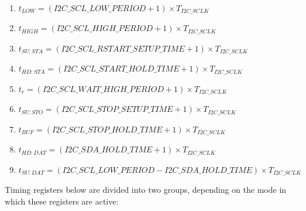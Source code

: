 \documentclass[main\_\_EN.tex]{subfiles}
\begin{document}
\begin{enumerate}
\item   $t_{LOW} = (\hyperref[fielddesc:I2CSCLLOWPERIOD]{I2C\_SCL\_LOW\_PERIOD} + 1) \times  T_{I2C\_SCLK}$

\item   $t_{HIGH} = (\hyperref[fielddesc:I2CSCLHIGHPERIOD]{I2C\_SCL\_HIGH\_PERIOD} + 1) \times  T_{I2C\_SCLK}$

\item   $t_{SU:STA} = (\hyperref[fielddesc:I2CSCLRSTARTSETUPTIME]{I2C\_SCL\_RSTART\_SETUP\_TIME} + 1) \times  T_{I2C\_SCLK}$

\item   $t_{HD:STA} = (\hyperref[fielddesc:I2CSCLSTARTHOLDTIME]{I2C\_SCL\_START\_HOLD\_TIME} +1) \times  T_{I2C\_SCLK}$

\item   $t_{r} = (\hyperref[fielddesc:I2CSCLWAITHIGHPERIOD]{I2C\_SCL\_WAIT\_HIGH\_PERIOD} + 1 ) \times  T_{I2C\_SCLK}$

\item   $t_{SU:STO} = (\hyperref[fielddesc:I2CSCLSTOPSETUPTIME]{I2C\_SCL\_STOP\_SETUP\_TIME}  + 1) \times  T_{I2C\_SCLK}$

\item   $t_{BUF} = (\hyperref[fielddesc:I2CSCLSTOPHOLDTIME]{I2C\_SCL\_STOP\_HOLD\_TIME}  + 1) \times  T_{I2C\_SCLK}$

\item   $t_{HD:DAT} = (\hyperref[fielddesc:I2CSDAHOLDTIME]{I2C\_SDA\_HOLD\_TIME} +1) \times  T_{I2C\_SCLK}$

\item   $t_{SU:DAT} = (\hyperref[fielddesc:I2CSCLLOWPERIOD]{I2C\_SCL\_LOW\_PERIOD} - \hyperref[fielddesc:I2CSDAHOLDTIME]{I2C\_SDA\_HOLD\_TIME}) \times  T_{I2C\_SCLK}$
\end{enumerate}

Timing registers below are divided into two groups, depending on the mode in which these registers are active:
\end{document}
